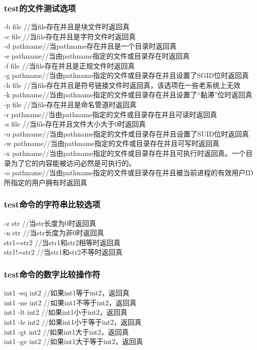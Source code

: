 \documentclass[11pt,a4paper,titlepage]{article}
\begin{document}
{\subsubsection{\kai test的文件测试选项}
-b file    //当file存在并且是块文件时返回真\\
-c file    //当file存在并且是字符文件时返回真\\
-d pathname//当pathname存在并且是一个目录时返回真\\
-e pathname//当由pathname指定的文件或目录存在时返回真\\
-f file    //当file存在并且是正规文件时返回真\\
-g pathname//当由pathname指定的文件或目录存在并且设置了SGID位时返回真\\
-h file    //当file存在并且是符号链接文件时返回真，该选项在一些老系统上无效\\
-k pathname//当由pathname指定的文件或目录存在并且设置了“黏滞”位时返回真\\
-p file    //当file存在并且是命名管道时返回真\\
-r pathname//当由pathname指定的文件或目录存在并且可读时返回真\\
-s file    //当file存在并且文件大小大于0时返回真\\
-u pathname//当由pathname指定的文件或目录存在并且设置了SUID位时返回真\\
-w pathname//当由pathname指定的文件或目录存在并且可写时返回真\\
-x pathname//当由pathname指定的文件或目录存在并且可执行时返回真。一个目录为了它的内容能被访问必然是可执行的。\\
-o pathname//当由pathname指定的文件或目录存在并且被当前进程的有效用户ID所指定的用户拥有时返回真
\subsubsection{\kai test命令的字符串比较选项}
-z str     //当str长度为0时返回真\\
-n str     //当str长度为非0时返回真\\ 
str1=str2  //当str1和str2相等时返回真\\
str1!=str2 //当str1和str2不等时返回真\\
\subsubsection{\kai test命令的数字比较操作符}
int1 -eq int2      //如果int1等于int2，返回真\\
int1 -ne int2      //如果int1不等于int2，返回真\\
int1 -lt int2      //如果int1小于int2，返回真\\
int1 -le int2      //如果int1小于等于int2，返回真\\
int1 -gt int2      //如果int1大于int2，返回真\\
int1 -ge int2      //如果int1大于等于int2，返回真\\
}
\end{document}
